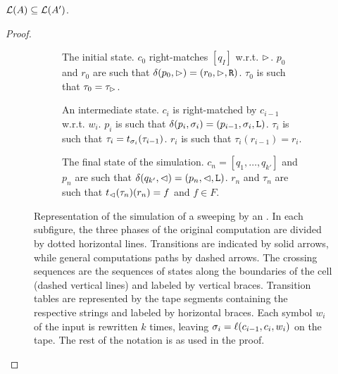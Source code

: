 \begin{lemm}\label{lem:swkLAtoNFA-1}
	$\mathcal L(A)\subseteq\mathcal L(A')$.
\end{lemm}
\begin{proof}

	\begin{figure}
		\centering
		\begin{subfigure}[b]{0.32\textwidth}
			\centering
			
			\caption{The initial state.
				$c_0$ right-matches $[q_I]$ w.r.t. $\rhd$.
				$p_0$ and $r_0$ are such that $\delta(p_0,\rhd)=(r_0,\rhd,\mathtt R)$.
				$\tau_0$ is such that $\tau_0=\tau_\rhd$.\newline}
		\end{subfigure}
		\hfill
		\begin{subfigure}[b]{0.32\textwidth}
			\centering
			
			\caption{An intermediate state.
				$c_i$ is right-matched by $c_{i-1}$ w.r.t. $w_i$.
				$p_i$ is such that $\delta(p_i,\sigma_i)=(p_{i-1},\sigma_i,\mathtt L)$.
				$\tau_i$ is such that $\tau_i=t_{\sigma_i}(\tau_{i-1})$.
				$r_i$ is such that $\tau_i(r_{i-1})=r_i$.}
		\end{subfigure}
		\hfill
		\begin{subfigure}[b]{0.33\textwidth}
			\centering
			
			\caption{The final state of the simulation.
			$c_n=[q_1,\dots,q_{k'}]$ and $p_n$ are such that $\delta(q_{k'},\lhd)=(p_n,\lhd,\mathtt L)$.
			$r_n$ and $\tau_n$ are such that $t_\lhd(\tau_n)(r_n)=f$ and $f\in F$.\newline}
		\end{subfigure}

		\caption{Representation of the simulation of a sweeping \kDLA by an \NFA.
			In each subfigure, the three phases of the original computation are divided by dotted horizontal lines.
			Transitions are indicated by solid arrows, while general computations paths by dashed arrows.
			The crossing sequences are the sequences of states along the boundaries of the cell (dashed vertical lines) and labeled by vertical braces.
			Transition tables are represented by the tape segments containing the respective strings and labeled by horizontal braces.
			Each symbol $w_i$ of the input is rewritten $k$ times, leaving $\sigma_i=\ell(c_{i-1},c_i,w_i)$ on the tape.
			The rest of the notation is as used in the proof.}
		\label{fig:three_subfigures}
	\end{figure}


\end{proof}
